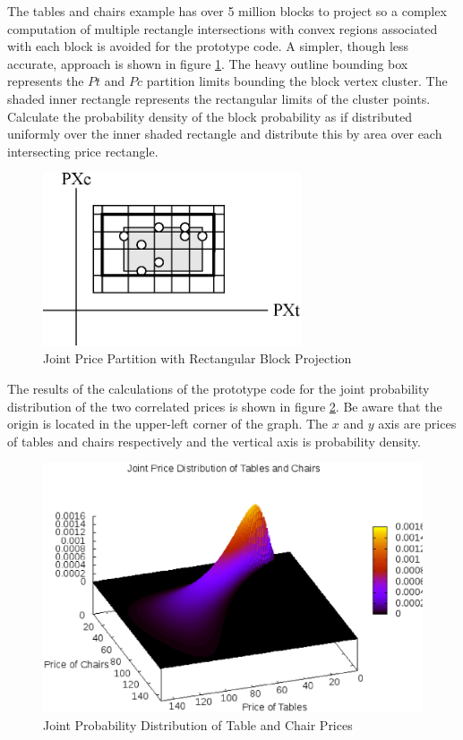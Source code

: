 The tables and chairs example has over 5 million blocks to project so a complex computation of multiple rectangle intersections with convex regions associated with each block is avoided for the prototype code. A simpler, though less accurate, approach is shown in figure \ref{fig:ptc_rectange_rectangle}. The heavy outline bounding box represents the $Pt$ and $Pc$ partition limits bounding the block vertex cluster. The shaded inner rectangle represents the rectangular limits of the cluster points. Calculate the probability density of the block probability as if distributed uniformly over the inner shaded rectangle and distribute this by area over each intersecting price rectangle. 

\begin{figure}
  \centering
  \includegraphics[width=3in]{Images/ptc_rectangle_rectangle}
  \caption[Joint Price Partition with Rectangular Block Projection]
          {Joint Price Partition with Rectangular Block Projection}
  \label{fig:ptc_rectange_rectangle}
\end{figure}

The results of the calculations of the prototype code for the joint probability distribution of the two correlated prices is shown in figure \ref{fig:Ptc}. Be aware that the origin is located in the upper-left corner of the graph. The $x$ and $y$ axis are prices of tables and chairs respectively and the vertical axis is probability density.
\begin{figure}
  \centering
  \includegraphics[width=120mm]{Images/Ptc.eps}
  \caption[Joint Probability Distribution of Table and Chair Prices]
          {Joint Probability Distribution of Table and Chair Prices}
  \label{fig:Ptc}
\end{figure}

